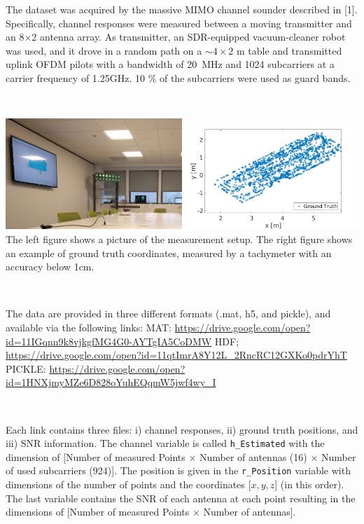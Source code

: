 \documentclass[letter]{moderncv} %
\begin{document}
The dataset was acquired by the massive MIMO channel sounder described in [1].
Specifically, channel responses were measured between a moving transmitter and an 8$\times$2 antenna array. 
As transmitter, an SDR-equipped vacuum-cleaner robot was used, and it drove in a random path on a $\sim 4\times 2$ m table and transmitted uplink OFDM pilots with a bandwidth of 20~MHz and 1024 subcarriers at a carrier frequency of 1.25GHz. 10 \% of the subcarriers were used as guard bands.
\vspace{22ex}

~


\includegraphics[width=0.5\textwidth]{ParisEnvironment}\includegraphics[width=0.5\textwidth]{IndoorDataset}
The left figure shows a picture of the measurement setup. The
right figure shows  an example of  ground truth coordinates, measured by a tachymeter with an accuracy below 1cm.
\vspace{4ex}

 
~

The data are provided in three different formats (.mat, h5, and pickle), and    available via the following links: \newline
  MAT:    \url{https://drive.google.com/open?id=11IGqnn9k8vjkgfMG4G0-AYTgIA5CoDMW} \newline
  HDF;    \url{https://drive.google.com/open?id=11qtImrA8Y12L_2RncRC12GXKo0pdrYhT} \newline
  PICKLE: \url{https://drive.google.com/open?id=1HNXjmyMZe6D828oYuhEQqmW5jwf4wy_I} \newline

~

Each link contains three files:    i) channel responses, ii) ground truth positions, and iii) SNR information.   
The channel variable is called \texttt{h\_Estimated} with the dimension of [Number of measured Points $\times$ Number of antennas (16) $\times$ Number of used subcarriers (924)]. The position is given in the \texttt{r\_Position} variable with dimensions of the number of points  and the coordinates [$x,y,z$] (in this order). The last variable contains the SNR of each antenna at each point resulting in the dimensions 
of [Number of measured Points $\times$ Number of antennas].
\end{document}
